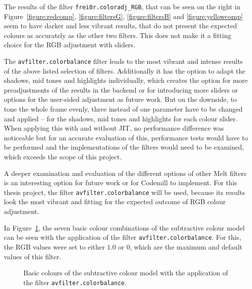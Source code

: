 \documentclass[../MasterThesis.tex]{subfiles}
\begin{document}
The results of the filter \texttt{frei0r.coloradj\_RGB}, that can be seen on the right in Figure~\ref{figure:redcomp}, \ref{figure:filtersG}, \ref{figure:filtersB} and \ref{figure:yellowcomp} seem to have darker and less vibrant results, that do not present the expected colours as accurately as the other two filters. This does not make it a fitting choice for the RGB adjustment with sliders.


The \texttt{avfilter.colorbalance} filter leads to the most vibrant and intense results of the above listed selection of filters. Additionally it has the option to adapt the shadows, mid tones and highlights individually, which creates the option for more preadjustments of the results in the backend or for introducing more sliders or options for the user-sided adjustment as future work.
But on the downside, to tone the whole frame evenly, three instead of one parameter have to be changed and applied -- for the shadows, mid tones and highlights for each colour slider.
When applying this with and without JIT, no performance difference was noticeable but for an accurate evaluation of this, performance tests would have to be performed and the implementations of the filters would need to be examined, which exceeds the scope of this project.

A deeper examination and evaluation of the different options of other Melt filters is an interesting option for future work or for Codemill to implement. For this thesis project, the filter \texttt{avfilter.colorbalance} will be used, because its results look the most vibrant and fitting for the expected outcome of RGB colour adjustment.

In Figure~\ref{figure:septopus}, the seven basic colour combinations of the subtractive colour model can be seen with the application of the filter \texttt{avfilter.colorbalance}. For this, the RGB values were set to either $1.0$ or $0$, which are the maximum and default values of this filter. 



\begin{figure}[H]
	\begin{center}
		\caption[Basic colours with the application of the filter \texttt{avfilter.colorbalance}.]{Basic colours of the subtractive colour model with the application of the filter \texttt{avfilter.colorbalance}.}
		\label{figure:septopus}
	\end{center}
\end{figure}
\end{document}
